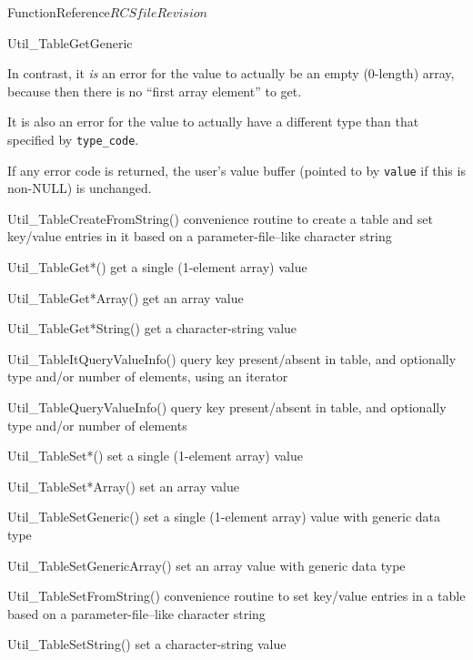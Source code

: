 \begin{cactuspart}{FunctionReference}{$RCSfile$}{$Revision$}
\begin{FunctionDescription}{Util\_TableGetGeneric}
\begin{Discussion}
In contrast, it {\em is\/} an error for the value to actually be an
empty (0-length) array, because then there is no ``first array element''
to get.

It is also an error for the value to actually have a different type
than that specified by \verb|type_code|.

If any error code is returned, the user's value buffer
(pointed to by \verb|value| if this is non-NULL) is unchanged.
\end{Discussion}

\begin{SeeAlsoSection}
\begin{SeeAlso}{Util\_TableCreateFromString()}
convenience routine to create a table and set key/value entries
in it based on a parameter-file--like character string
\end{SeeAlso}
\begin{SeeAlso}{Util\_TableGet*()}
get a single (1-element array) value
\end{SeeAlso}
\begin{SeeAlso}{Util\_TableGet*Array()}
get an array value
\end{SeeAlso}
\begin{SeeAlso}{Util\_TableGet*String()}
get a character-string value
\end{SeeAlso}
\begin{SeeAlso}{Util\_TableItQueryValueInfo()}
query key present/absent in table, and optionally type and/or number
of elements, using an iterator
\end{SeeAlso}
\begin{SeeAlso}{Util\_TableQueryValueInfo()}
query key present/absent in table, and optionally type and/or number
of elements
\end{SeeAlso}
\begin{SeeAlso}{Util\_TableSet*()}
set a single (1-element array) value
\end{SeeAlso}
\begin{SeeAlso}{Util\_TableSet*Array()}
set an array value
\end{SeeAlso}
\begin{SeeAlso}{Util\_TableSetGeneric()}
set a single (1-element array) value with generic data type
\end{SeeAlso}
\begin{SeeAlso}{Util\_TableSetGenericArray()}
set an array value with generic data type
\end{SeeAlso}
\begin{SeeAlso}{Util\_TableSetFromString()}
convenience routine to set key/value entries in a table based on a
parameter-file--like character string
\end{SeeAlso}
\begin{SeeAlso}{Util\_TableSetString()}
set a character-string value
\end{SeeAlso}
\end{SeeAlsoSection}


\end{FunctionDescription}
\end{cactuspart}
